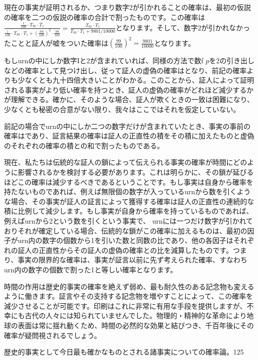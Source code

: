 \documentclass[a4paper,11pt,openany]{ltjsbook}
\begin{document}
現在の事実が証明されるか、つまり数字2が引かれることの確率は、最初の仮説の確率を二つの仮説の確率の合計で割ったものです。この確率は$\frac{\frac{1}{100} \cdot T_{97} \cdot T_1}{\frac{1}{100} \cdot T_{97} \cdot T_1 + \left(\frac{99}{100}\right)^2 \cdot \frac{99}{100}} = \frac{T_{97} \cdot T_1}{T_{97} \cdot T_1 + 9801/10000}$となります。そして、数字2が引かれなかったことと証人が嘘をついた確率は$\left(\frac{99}{100}\right)^2 = \frac{9801}{10000}$となります。


もしurnの中にしか数字Iと2が含まれていれば、同様の方法で数f $p$を2の引き出しなどの確率として見つけ出し、従って証人の虚偽の確率はとなり、前記の確率よりも少なくとも九十四倍大きいことがわかる。このことから、証人によって証明される事実がより低い確率を持つとき、証人の虚偽の確率がどれほど減少するかが理解できる。確かに、そのような場合、証人が欺くときの一致は困難になり、少なくとも秘密の合意がない限り、我々はここではそれを仮定していない。

前記の場合でurnの中にしか二つの数字だけが含まれていたとき、事実の事前の確率はであり、証言結果の確率は証人の正直性の積をその積に加えたものと虚偽のそれぞれの確率の積との和で割ったものである。

現在、私たちは伝統的な証人の鎖によって伝えられる事実の確率が時間にどのように影響されるかを検討する必要があります。これは明らかに、その鎖が延びるほどこの確率は減少するべきであるということです。もし事実は自身から確率を持たないものであれば、例えば無限個の数字が入っているurnから数を引くような場合、その事実が証人の証言によって獲得する確率は証人の正直性の連続的な積に比例して減少します。もし事実が自身から確率を持っているものであれば、例えばurnから2という数を引くという事実で、 urnには一つだけ数字が引かれておりそれが確定している場合、伝統的な鎖がこの確率に加えるものは、最初の因子がurn内の数字の個数から1を引いた数と同数の比であり、他の各因子はそれぞれの証人の正直性からその証人の虚偽の確率との比を減算したものです。つまり、事実の限界的な確率は、事実が証言以前に先ず考えられた確率、すなわちurn内の数字の個数で割った1と等しい確率となります。

時間の作用は歴史的事実の確率を絶えず弱め、最も耐久性のある記念物も変えるように働きます。証言やその支持する記念物を増やすことによって、この確率を減少させることが可能です。印刷はこれに非常に有用な手段を提供しますが、不幸にも古代の人々には知られていませんでした。物理的・精神的な革命により地球の表面は常に揺れ動くため、時間の必然的な効果と結びつき、千百年後にその確率が疑問視されるでしょう。

歴史的事実として今日最も確かなものとされる諸事実についての確率論。125
\end{document}
